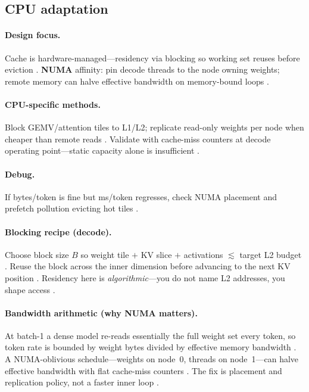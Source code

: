 \subsection{CPU adaptation}
\label{sec:ch06_cpu_residency}

\paragraph{Design focus.}
Cache is hardware-managed---residency via blocking so working set reuses before eviction \citep{dlbook,rotem2018glow}.
\textbf{NUMA} affinity: pin decode threads to the node owning weights; remote memory can halve effective bandwidth on memory-bound loops \citep{patel2025llminference,memoryfloor2026}.

\paragraph{CPU-specific methods.}
Block GEMV/attention tiles to L1/L2; replicate read-only weights per node when cheaper than remote reads \citep{kwon2023vllm,dlbook}.
Validate with cache-miss counters at decode operating point---static capacity alone is insufficient \citep{patel2025llminference}.

\paragraph{Debug.}
If bytes/token is fine but ms/token regresses, check NUMA placement and prefetch pollution evicting hot tiles \citep{dlbook,taxbreak2026}.

\paragraph{Blocking recipe (decode).}
Choose block size $B$ so weight tile $+$ KV slice $+$ activations $\lesssim$ target L2 budget \citep{dlbook,kwon2023vllm}.
Reuse the block across the inner dimension before advancing to the next KV position \citep{dao2022flashattention,patel2025llminference}.
Residency here is \emph{algorithmic}---you do not name L2 addresses, you shape access \citep{rotem2018glow,yirage2026}.

\paragraph{Bandwidth arithmetic (why NUMA matters).}
At batch-1 a dense model re-reads essentially the full weight set every token, so token rate is bounded by weight bytes divided by effective memory bandwidth \citep{kwon2023vllm,memoryfloor2026}.
A NUMA-oblivious schedule---weights on node~0, threads on node~1---can halve effective bandwidth with flat cache-miss counters \citep{patel2025llminference,dlbook}.
The fix is placement and replication policy, not a faster inner loop \citep{taxbreak2026,memoryfloor2026}.

